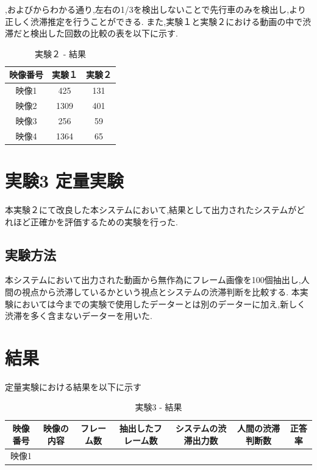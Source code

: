 ,およびからわかる通り,左右の1/3を検出しないことで先行車のみを検出し,より正しく渋滞推定を行うことができる.
また,実験１と実験２における動画の中で渋滞だと検出した回数の比較の表を以下に示す.

\begin{table}[htbp]
  \centering
  \begin{scriptsize}
  \begin{tabular}{ccc}
  \toprule
映像番号 & 実験１ & 実験２\\
  \midrule
映像1 & 425 & 131\\
映像2 & 1309 & 401\\
映像3 & 256 & 59\\
映像4 & 1364 & 65\\
  \bottomrule
  \end{tabular}
  \end{scriptsize}
  \caption{実験２ - 結果}
  \label{tab:dataset}
\end{table}
\newpage
\section{実験3 定量実験}
本実験２にて改良した本システムにおいて,結果として出力されたシステムがどれほど正確かを評価するための実験を行った.

\subsection{実験方法}
本システムにおいて出力された動画から無作為にフレーム画像を100個抽出し,人間の視点から渋滞しているかという視点とシステムの渋滞判断を比較する.
本実験においては今までの実験で使用したデーターとは別のデーターに加え,新しく渋滞を多く含まないデーターを用いた.


\section{結果}
定量実験における結果を以下に示す

\begin{table}[htbp]
  \centering
  \begin{scriptsize}
  \begin{tabular}{ccccccc}
  \toprule
映像番号 & 映像の内容 & フレーム数 & 抽出したフレーム数 & システムの渋滞出力数 & 人間の渋滞判断数 & 正答率\\
  \midrule
映像1 & & & & & & \\
  \bottomrule
  \end{tabular}
  \end{scriptsize}
  \caption{実験3 - 結果}
  \label{tab:dataset}
\end{table}
